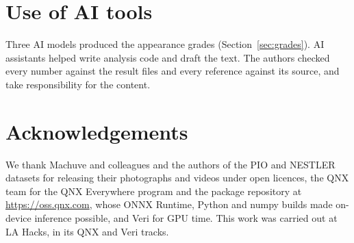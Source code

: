 \documentclass[10pt,twocolumn]{article}
\begin{document}
\section*{Use of AI tools}
Three AI models produced the appearance grades (Section~\ref{sec:grades}). AI assistants helped write analysis code
and draft the text. The authors checked every number against the result files and every reference against its
source, and take responsibility for the content.

\section*{Acknowledgements}
We thank Machuve and colleagues and the authors of the PIO and NESTLER datasets for releasing their photographs and
videos under open licences, the QNX team for the QNX Everywhere program and the package repository at
\url{https://oss.qnx.com}, whose ONNX Runtime, Python and numpy builds made on-device inference possible, and Veri for
GPU time. This work was carried out at LA Hacks, in its QNX and Veri tracks.

\clearpage


\end{document}
